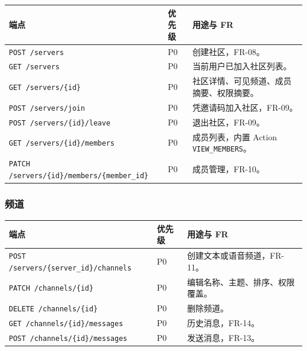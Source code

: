 \noindent\begin{tabularx}{\textwidth}{L{6.4cm}L{2.2cm}Y}
  \toprule
  端点 & 优先级 & 用途与 FR \\
  \midrule
  \texttt{POST /servers} & P0 & 创建社区，FR-08。 \\
  \texttt{GET /servers} & P0 & 当前用户已加入社区列表。 \\
  \texttt{GET /servers/\{id\}} & P0 & 社区详情、可见频道、成员摘要、权限摘要。 \\
  \texttt{POST /servers/join} & P0 & 凭邀请码加入社区，FR-09。 \\
  \texttt{POST /servers/\{id\}/leave} & P0 & 退出社区，FR-09。 \\
  \texttt{GET /servers/\{id\}/members} & P0 & 成员列表，内置 Action \texttt{VIEW\_MEMBERS}。 \\
  \texttt{PATCH /servers/\{id\}/members/\{member\_id\}} & P0 & 成员管理，FR-10。 \\
  \bottomrule
\end{tabularx}


\subsubsection{频道}

\noindent\begin{tabularx}{\textwidth}{L{6.4cm}L{2.2cm}Y}
  \toprule
  端点 & 优先级 & 用途与 FR \\
  \midrule
  \texttt{POST /servers/\{server\_id\}/channels} & P0 & 创建文本或语音频道，FR-11。 \\
  \texttt{PATCH /channels/\{id\}} & P0 & 编辑名称、主题、排序、权限覆盖。 \\
  \texttt{DELETE /channels/\{id\}} & P0 & 删除频道。 \\
  \texttt{GET /channels/\{id\}/messages} & P0 & 历史消息，FR-14。 \\
  \texttt{POST /channels/\{id\}/messages} & P0 & 发送消息，FR-13。 \\
  \bottomrule
\end{tabularx}

